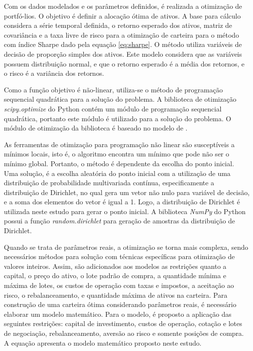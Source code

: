         \ipar Com os dados modelados e os parâmetros definidos, é realizada a otimização de portfó-lios. O objetivo é definir a alocação ótima de ativos. A base para cálculo considera a série temporal definida, o retorno esperado dos ativos, matriz de covariância e a taxa livre de risco para a otimização de carteira para o método com índice Sharpe dado pela equação \ref{eq:sharpe}. O método utiliza variáveis de decisão de proporção simples dos ativos. Este modelo considera que as variáveis possuem distribuição normal, e que o retorno esperado é a média dos retornos, e o risco é a variância dos retornos.
        
        \ipar Como a função objetivo é não-linear, utiliza-se o método de programação sequencial quadrática para a solução do problema. A biblioteca de otimização \textit{scipy.optimize} do Python contém um módulo de programação sequencial quadrática, portanto este módulo é utilizado para a solução do problema. O módulo de otimização da biblioteca é baseado no modelo de .
        
        \ipar As ferramentas de otimização para programação não linear são susceptíveis a mínimos locais, isto é, o algoritmo encontra um mínimo que pode não ser o mínimo global. Portanto, o método é dependente da escolha do ponto inicial. Uma solução, é a escolha aleatória do ponto inicial com a utilização de uma distribuição de probabilidade multivariada contínua, especificamente a distribuição de Dirichlet, no qual gera um vetor não nulo para variável de decisão, e a soma dos elementos do vetor é igual a 1. Logo, a distribuição de Dirichlet é utilizada neste estudo para gerar o ponto inicial. A biblioteca \textit{NumPy} do Python possui a função \textit{random.dirichlet} para geração de amostras da distribuição de Dirichlet.

        \ipar Quando se trata de parâmetros reais, a otimização se torna mais complexa, sendo necessários métodos para solução com técnicas específicas para otimização de valores inteiros. Assim, são adicionados aos modelos as restrições quanto a capital, o preço do ativo, o lote padrão de compra, a quantidade mínima e máxima de lotes, os custos de operação com taxas e impostos, a aceitação ao risco, o rebalanceamento, e quantidade máxima de ativos na carteira. Para construção de uma carteira ótima considerando parâmetros reais, é necessário elaborar um modelo matemático. Para o modelo, é proposto a aplicação das seguintes restrições: capital de investimento, custos de operação, cotação e lotes de negociação, rebalanceamento, aversão ao risco e somente posições de compra. A equação  apresenta o modelo matemático proposto neste estudo.


